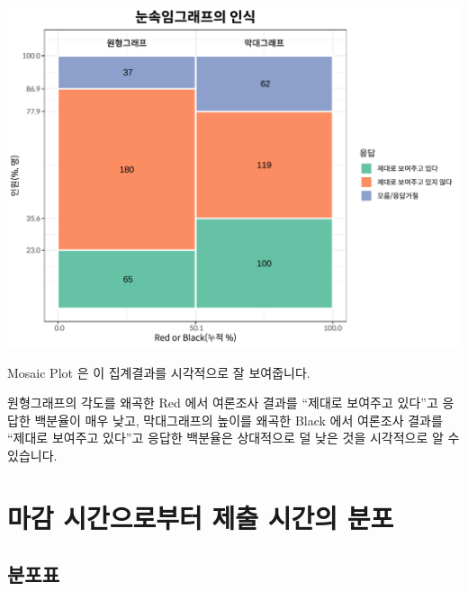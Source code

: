 \documentclass[
]{book}
\begin{document}
\includegraphics{_main_files/figure-latex/unnamed-chunk-49-1.pdf}

Mosaic Plot 은 이 집계결과를 시각적으로 잘 보여줍니다.

원형그래프의 각도를 왜곡한 Red 에서 여론조사 결과를 ``제대로 보여주고 있다''고 응답한 백분율이 매우 낮고, 막대그래프의 높이를 왜곡한 Black 에서 여론조사 결과를 ``제대로 보여주고 있다''고 응답한 백분율은 상대적으로 덜 낮은 것을 시각적으로 알 수 있습니다.

\section{마감 시간으로부터 제출 시간의 분포}\label{uxb9c8uxac10-uxc2dcuxac04uxc73cuxb85cuxbd80uxd130-uxc81cuxcd9c-uxc2dcuxac04uxc758-uxbd84uxd3ec-1}

\subsection{분포표}\label{uxbd84uxd3ecuxd45c-2}
\end{document}
